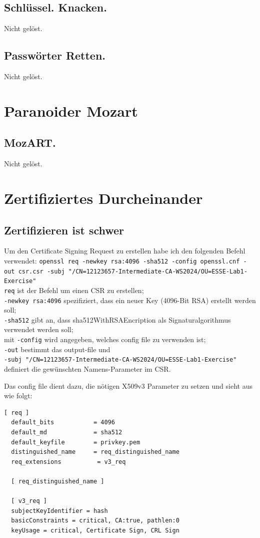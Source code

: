 \documentclass[12pt,a4paper,titlepage,oneside]{scrartcl}
\begin{document}
\subsection{Schl\"ussel. Knacken.}
Nicht gelöst.

\subsection{Passw\"orter Retten.}
Nicht gelöst.


\section{Paranoider Mozart}

\subsection{MozART.}
Nicht gelöst.


\section{Zertifiziertes Durcheinander}

\subsection{Zertifizieren ist schwer}
Um den Certificate Signing Request zu erstellen habe ich den folgenden Befehl verwendet:
\lstinline{openssl req -newkey rsa:4096 -sha512 -config openssl.cnf -out csr.csr -subj "/CN=12123657-Intermediate-CA-WS2024/OU=ESSE-Lab1-Exercise"} \\
\lstinline{req} ist der Befehl um einen CSR zu erstellen; \\
\lstinline{-newkey rsa:4096} spezifiziert, dass ein neuer Key (4096-Bit RSA) erstellt werden soll; \\
\lstinline{-sha512} gibt an, dass sha512WithRSAEncription als Signaturalgorithmus verwendet werden soll; \\
mit \lstinline{-config} wird angegeben, welches config file zu verwenden ist; \\
\lstinline{-out} bestimmt das output-file und \\
\lstinline{-subj "/CN=12123657-Intermediate-CA-WS2024/OU=ESSE-Lab1-Exercise"} definiert die gewünschten Namens-Parameter im CSR.

Das config file dient dazu, die nötigen X509v3 Parameter zu setzen und sieht aus wie folgt:

\begin{lstlisting}[caption=openssl.cnf,label=code:opensslConfig,style=simple]
  [ req ]
  default_bits           = 4096
  default_md             = sha512
  default_keyfile        = privkey.pem
  distinguished_name     = req_distinguished_name
  req_extensions          = v3_req

  [ req_distinguished_name ]

  [ v3_req ]
  subjectKeyIdentifier = hash
  basicConstraints = critical, CA:true, pathlen:0
  keyUsage = critical, Certificate Sign, CRL Sign
\end{lstlisting}
\end{document}
